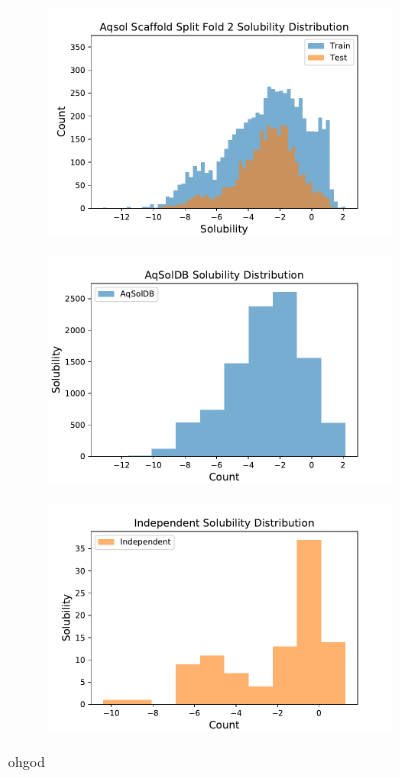 \documentclass[journal=jcisd8,manuscript=article]{achemso}
\begin{document}
\begin{figure}[tb]
    \begin{subfigure}[t]{0.48\textwidth}
        \centering
        \includegraphics[width=\linewidth]{figures/aqsol_scaf2_soldist.pdf}
    \end{subfigure}
    
    
    \begin{subfigure}[t]{0.48\textwidth}
        \centering
        \includegraphics[width=\linewidth]{figures/AqSolDB_solhist.pdf}
    \end{subfigure}%
    \hfill
    \begin{subfigure}[t]{0.48\textwidth}
        \centering
        \includegraphics[width=\linewidth]{figures/Independent_solhist.pdf}
    \end{subfigure}
    \caption{ohgod}
    \label{fig:solhists}
\end{figure}
\end{document}
